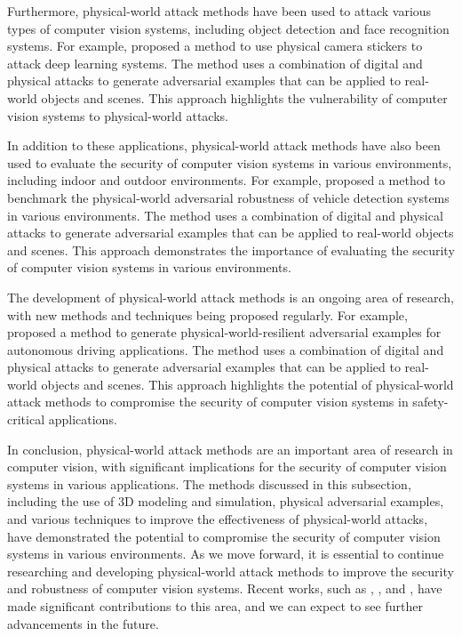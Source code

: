 \documentclass[11pt]{article}
\begin{document}
Furthermore, physical-world attack methods have been used to attack various types of computer vision systems, including object detection and face recognition systems. For example, \cite{ref76} proposed a method to use physical camera stickers to attack deep learning systems. The method uses a combination of digital and physical attacks to generate adversarial examples that can be applied to real-world objects and scenes. This approach highlights the vulnerability of computer vision systems to physical-world attacks.

In addition to these applications, physical-world attack methods have also been used to evaluate the security of computer vision systems in various environments, including indoor and outdoor environments. For example, \cite{ref40} proposed a method to benchmark the physical-world adversarial robustness of vehicle detection systems in various environments. The method uses a combination of digital and physical attacks to generate adversarial examples that can be applied to real-world objects and scenes. This approach demonstrates the importance of evaluating the security of computer vision systems in various environments.

The development of physical-world attack methods is an ongoing area of research, with new methods and techniques being proposed regularly. For example, \cite{ref77} proposed a method to generate physical-world-resilient adversarial examples for autonomous driving applications. The method uses a combination of digital and physical attacks to generate adversarial examples that can be applied to real-world objects and scenes. This approach highlights the potential of physical-world attack methods to compromise the security of computer vision systems in safety-critical applications.

In conclusion, physical-world attack methods are an important area of research in computer vision, with significant implications for the security of computer vision systems in various applications. The methods discussed in this subsection, including the use of 3D modeling and simulation, physical adversarial examples, and various techniques to improve the effectiveness of physical-world attacks, have demonstrated the potential to compromise the security of computer vision systems in various environments. As we move forward, it is essential to continue researching and developing physical-world attack methods to improve the security and robustness of computer vision systems. Recent works, such as \cite{ref78}, \cite{ref79}, and \cite{ref80}, have made significant contributions to this area, and we can expect to see further advancements in the future.
\end{document}
